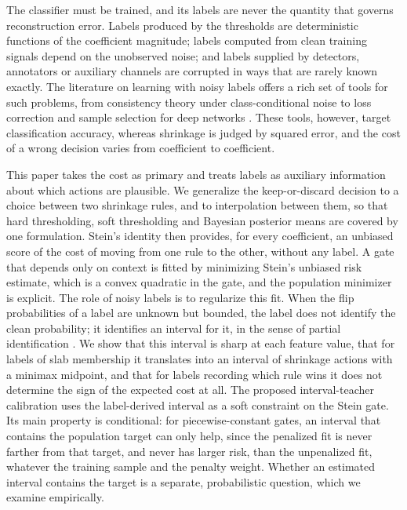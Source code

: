 \documentclass[11pt]{article}
\theoremstyle{plain}
\theoremstyle{definition}
\theoremstyle{remark}
\begin{document}
The classifier must be trained, and its labels are never the quantity that governs
reconstruction error. Labels produced by the thresholds are deterministic functions of the
coefficient magnitude; labels computed from clean training signals depend on the
unobserved noise; and labels supplied by detectors, annotators or auxiliary channels are
corrupted in ways that are rarely known exactly. The literature on learning with noisy
labels offers a rich set of tools for such problems, from consistency theory under
class-conditional noise \citep{natarajan2013learning,scott2013classification,
menon2015learning,blanchard2016classification,cannings2020classification} to loss
correction and sample selection for deep networks \citep{patrini2017making,
han2018coteaching,song2023learning}. These tools, however, target classification accuracy,
whereas shrinkage is judged by squared error, and the cost of a wrong decision varies from
coefficient to coefficient.

This paper takes the cost as primary and treats labels as auxiliary information about
which actions are plausible. We generalize the keep-or-discard decision to a choice between
two shrinkage rules, and to interpolation between them, so that hard thresholding, soft
thresholding and Bayesian posterior means are covered by one formulation. Stein's identity
\citep{stein1981estimation} then provides, for every coefficient, an unbiased score of the
cost of moving from one rule to the other, without any label. A gate that depends only on
context is fitted by minimizing Stein's unbiased risk estimate, which is a convex quadratic
in the gate, and the population minimizer is explicit. The role of noisy labels is to
regularize this fit. When the flip probabilities of a label are unknown but bounded, the
label does not identify the clean probability; it identifies an interval for it, in the
sense of partial identification \citep{manski2003partial}. We show that this interval is
sharp at each feature value, that for labels of slab membership it translates into an
interval of shrinkage actions with a minimax midpoint, and that for labels recording which
rule wins it does not determine the sign of the expected cost at all. The proposed
interval-teacher calibration uses the label-derived interval as a soft constraint on the
Stein gate. Its main property is conditional: for piecewise-constant gates, an interval that
contains the population target can only help, since the penalized fit is never farther from
that target, and never has larger risk, than the unpenalized fit, whatever the training sample
and the penalty weight. Whether an estimated interval contains the target is a separate,
probabilistic question, which we examine empirically.
\end{document}

